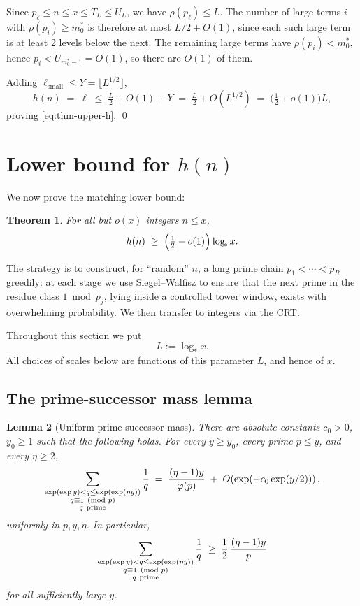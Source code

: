 \documentclass[11pt,reqno]{amsart}
\theoremstyle{plain}
\newtheorem{theorem}{Theorem}[section]
\newtheorem{lemma}[theorem]{Lemma}
\theoremstyle{definition}
\newcommand{\logstar}{\log_{\!*}}
\begin{document}
Since $p_\ell\le n\le x\le T_L\le U_L$, we have $\rho(p_\ell)\le L$. The number
of large terms $i$ with $\rho(p_i)\ge m_0^*$ is therefore at most $L/2+O(1)$,
since each such large term is at least 2 levels below the next. The remaining
large terms have $\rho(p_i)<m_0^*$, hence $p_i<U_{m_0^*-1}=O(1)$, so there are
$O(1)$ of them.

Adding $\ell_{\mathrm{small}}\le Y=\lfloor L^{1/2}\rfloor$,
\begin{equation}\label{eq:h-final-bound}
h(n) \;=\; \ell \;\le\; \tfrac{L}{2} + O(1) + Y
\;=\; \tfrac{L}{2} + O(L^{1/2})
\;=\; \bigl(\tfrac12 + o(1)\bigr) L,
\end{equation}
proving \eqref{eq:thm-upper-h}. \qed

\section{Lower bound for $h(n)$}\label{sec:lower-h}

We now prove the matching lower bound:

\begin{theorem}\label{thm:lower-h}
For all but $o(x)$ integers $n\le x$,
\begin{equation}\label{eq:thm-lower-h}
h(n) \;\ge\; \Bigl(\tfrac12 - o(1)\Bigr)\logstar x.
\end{equation}
\end{theorem}

The strategy is to construct, for ``random'' $n$, a long prime chain $p_1<\cdots<p_R$ greedily: at each stage we use Siegel--Walfisz to ensure that the next prime in the residue class $1\bmod p_j$, lying inside a controlled tower window, exists with overwhelming probability. We then transfer to integers via the CRT.

Throughout this section we put
\[
   L:=\logstar x.
\]
All choices of scales below are functions of this parameter $L$, and hence of
$x$.

\subsection{The prime-successor mass lemma}

\begin{lemma}[Uniform prime-successor mass]\label{lem:prime-successor-mass}
There are absolute constants $c_0>0$, $y_0\ge 1$ such that the following
holds. For every $y\ge y_0$, every prime $p\le y$, and every $\eta\ge 2$,
\[
\sum_{\substack{\exp(\exp y)<q\le \exp(\exp(\eta y))\\
q\equiv 1\pmod p\\ q\ {\rm prime}}}\frac1q
\;=\;
\frac{(\eta-1)y}{\varphi(p)}
\;+\;
O\!\left(\exp(-c_0\exp(y/2))\right),
\]
uniformly in $p,y,\eta$. In particular,
\[
\sum_{\substack{\exp(\exp y)<q\le \exp(\exp(\eta y))\\
q\equiv 1\pmod p\\ q\ {\rm prime}}}\frac1q
\;\ge\;
\frac12\,\frac{(\eta-1)y}{p}
\]
for all sufficiently large $y$.
\end{lemma}
\end{document}
